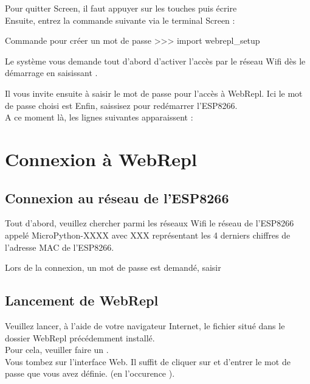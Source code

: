 Pour quitter Screen, il faut appuyer sur les touches  puis écrire  \\

Ensuite, entrez la commande suivante via le terminal Screen :
\begin{Bash}{Commande pour créer un mot de passe}
>>> import webrepl_setup
\end{Bash}

Le système vous demande tout d'abord d’activer l’accès par le réseau Wifi dès le démarrage en saisissant .


Il vous invite ensuite à saisir le mot de passe pour l'accès à WebRepl. Ici le mot de passe choisi est 
Enfin, saissisez  pour redémarrer l'ESP8266.\\
A ce moment là, les lignes suivantes apparaissent : 



\section{Connexion à WebRepl}



\subsection{Connexion au réseau de l'ESP8266}

Tout d'abord, veuillez chercher parmi les réseaux Wifi le réseau de l'ESP8266 appelé MicroPython-XXXX avec XXX représentant les 4 derniers chiffres de l'adresse MAC de l'ESP8266.

Lors de la connexion, un mot de passe est demandé, saisir 

\subsection{Lancement de WebRepl}

 Veuillez lancer, à l'aide de votre navigateur Internet, le fichier   situé dans le dossier WebRepl précédemment installé. \\
 Pour cela, veuiller faire un . \\
Vous tombez sur l’interface Web. Il suffit de cliquer sur  et d’entrer le mot de passe que vous avez définie.
(en l'occurence ).


